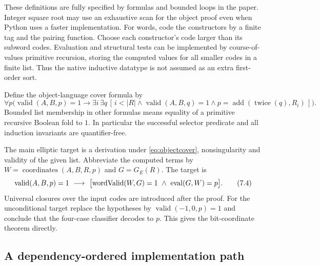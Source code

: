 These definitions are fully specified by formulas and bounded loops in
the paper. Integer square root may use an exhaustive scan for the object
proof even when Python uses a faster implementation.
For words, code the constructors by a finite tag and the pairing function.
Choose each constructor's code larger than its subword codes.
Evaluation and structural tests can be implemented by course-of-values
primitive recursion, storing the computed values for all smaller codes
in a finite list. Thus the native inductive datatype is not assumed as an
extra first-order sort.

Define the object-language cover formula by
\[
 \forall p\bigl(\operatorname{valid}(A,B,p)=1\to
   \exists i\,\exists q\,
   [\,i<|R|\wedge\operatorname{valid}(A,B,q)=1
    \wedge p=\operatorname{add}(\operatorname{twice}(q),R_i)\,]\bigr).
 \tag{7.3}\label{eq:objectcover}
\]
Bounded list membership in other formulas means equality of a primitive
recursive Boolean fold to $1$. In particular the successful selector
predicate and all induction invariants are quantifier-free.

The main elliptic target is a derivation under
\eqref{eq:objectcover}, nonsingularity and validity of the given list.
Abbreviate the computed terms by
$W=\operatorname{coordinates}(A,B,R,p)$ and $G=G_E(R)$. The target is
\[
 \operatorname{valid}(A,B,p)=1
 \ \longrightarrow\
 \bigl[\operatorname{wordValid}(W,G)=1\ \wedge\ \operatorname{eval}(G,W)=p\bigr].
 \tag{7.4}
\]
Universal closures over the input codes are introduced after the proof.
For the unconditional target replace the hypotheses by
$\operatorname{valid}(-1,0,p)=1$ and conclude that the four-case classifier
decodes to $p$. This gives the bit-coordinate theorem directly.

\subsection{A dependency-ordered implementation path}

